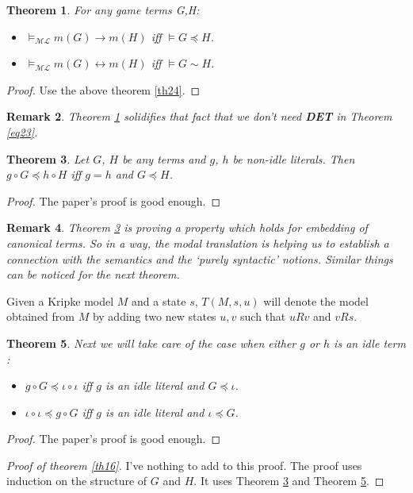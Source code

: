 \documentclass[10pt]{article}
\newcommand{\ml}{\mathcal{ML}}
\newcommand{\id}{\iota}
\newcommand{\cle}{\preccurlyeq}
\newtheorem{theorem}{Theorem}
\newtheorem{remark}[theorem]{Remark}
\begin{document}
		\begin{theorem}\label{th26}
			For any game terms G,H:
			\begin{itemize}
				\item $\models_{\ml} m(G) \rightarrow m(H)$ iff $\models G \cle H$.
				\item $\models_{\ml} m(G) \leftrightarrow m(H)$ iff $\models G \sim H$.
			\end{itemize}
		\end{theorem}
		\begin{proof}
			Use the above theorem \ref{th24}. 
		\end{proof}
			\begin{remark}
				Theorem \ref{th26} solidifies that fact that we don't need \textbf{DET} in Theorem \ref{eq23}.
			\end{remark}
		
		\begin{theorem}\label{th25}
			Let $G$, $H$ be any terms and $g$, $h$ be non-idle literals. Then
			$g\circ G\cle h\circ H$ iﬀ $g= h$ and $G\cle H$.
		\end{theorem}
		\begin{proof}
			The paper's proof is good enough.
		\end{proof}
		\begin{remark}
			Theorem \ref{th25} is proving a property which holds for \textit{embedding} of canonical terms. So in a way, the modal translation is helping us to establish a connection with the semantics and the `purely syntactic' notions. Similar things can  be noticed for the next theorem.
		\end{remark}
		Given a Kripke model $M$ and a state $s$, $T(M,s,u)$ will denote the model obtained from $M$ by adding two new states $u,v$ such that $uRv$ and $vRs$.
		\begin{theorem}\label{th27}
			Next we will take care of the case when either $g$ or $h$ is an idle term :
			\begin{itemize}
				\item $g\circ G\cle \id\circ\id$ iﬀ $g$ is an idle literal and $G\cle \id$.
				\item $\id\circ \id\cle g\circ G$ iﬀ $g$ is an idle literal and $\iota\cle G$.
			\end{itemize}
		\end{theorem}
	\begin{proof}
			The paper's proof is good enough.
		\end{proof}
		
		\begin{proof}[Proof of theorem \ref{th16}]
			I've nothing to add to this proof. The proof uses induction on the structure of $G$ and $H$. It uses Theorem \ref{th25} and Theorem \ref{th27}.
		\end{proof}
		
\end{document}
